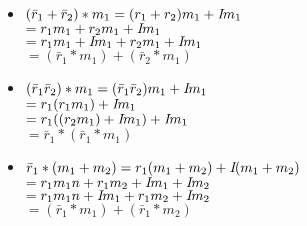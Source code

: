 \documentclass{article}
\begin{document}
\begin{itemize}
    \item $(\bar{r}_1 + \bar{r}_2) * m_1 = (r_1 + r_2)m_1 + \emph{I}m_1$\\
    $= r_1m_1 + r_2m_1 + \emph{I}m_1$\\
    $= r_1m_1 + \emph{I}m_1 + r_2m_1 + \emph{I}m_1$\\
    $= (\bar{r}_1 * m_1) + (\bar{r}_2 * m_1)$\\

    \item $(\bar{r}_1 \bar{r}_2) * m_1 = (\bar{r}_1 \bar{r}_2)m_1 + \emph{I}m_1$\\
    $= r_1(r_1m_1)+\emph{I}m_1$\\
    $= r_1((r_2m_1)+\emph{I}m_1) +\emph{I}m_1$\\
    $= \bar{r}_1 * (\bar{r}_1 * m_1)$\\

    \item $\bar{r}_1  * (m_1 + m_2) = r_1(m_1 + m_2) + \emph{I}(m_1 + m_2)$\\
    $= r_1m_1n + r_1m_2 + \emph{I}m_1 + \emph{I}m_2$\\
    $= r_1m_1n + \emph{I}m_1 + r_1m_2 + \emph{I}m_2$\\
    $= (\bar{r}_1 * m_1) + (\bar{r}_1 * m_2)$\\
\end{itemize}
\end{document}
